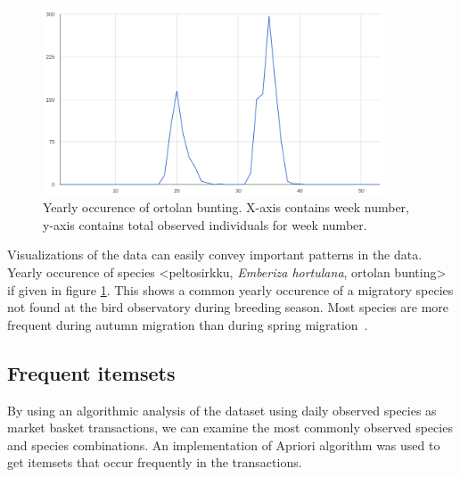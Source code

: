 \documentclass[english]{tktltiki2}
\begin{document}
\begin{figure}[htb]
\centering
\includegraphics[clip=true, width=0.9\textwidth]{embhor_weeks}
\caption{Yearly occurence of ortolan bunting. X-axis contains week number, y-axis contains total observed individuals for week number.}
\label{fig: embhor_weeks}
\end{figure}

Visualizations of the data can easily convey important patterns in the data. Yearly occurence of species <peltosirkku, \emph{Emberiza hortulana}, ortolan bunting> if given in figure \ref{fig: embhor_weeks}. This shows a common yearly occurence of a migratory species not found at the bird observatory during breeding season. Most species are more frequent during autumn migration than during spring migration~\cite{lehikoinen2000phenology}.






\subsection{Frequent itemsets}

By using an algorithmic analysis of the dataset using daily observed species as market basket transactions, we can examine the most commonly observed species and species combinations. An implementation of Apriori algorithm was used to get itemsets that occur frequently in the transactions.
\end{document}
